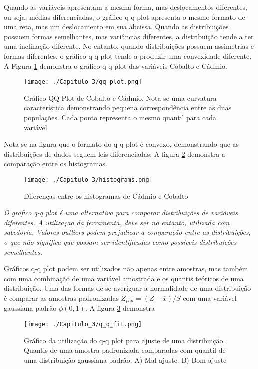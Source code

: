 Quando as variáveis apresentam a mesma forma, mas deslocamentos diferentes, ou seja, médias diferenciadas, o gráfico q-q plot apresenta o mesmo formato de uma reta, mas um deslocamento em sua abcissa. Quando as distribuições possuem formas semelhantes, mas variâncias diferentes, a distribuição tende a ter uma inclinação diferente. No entanto, quando distribuições possuem assimetrias e formas diferentes, o gráfico q-q plot tende a produzir uma convexidade diferente. A Figura \ref{QQplot} demonstra o gráfico q-q plot das variáveis Cobalto e Cádmio.

\FloatBarrier
\begin{figure}[!htb]
	\centering
	\texttt{[image: ./Capitulo\_3/qq-plot.png]}	
	\caption{Gráfico QQ-Plot de Cobalto e Cádmio. Nota-se uma curvatura característica demonstrando pequena correspondência entre as duas populações. Cada ponto representa o mesmo quantil para cada variável }
	\label{QQplot}
\end{figure}
\FloatBarrier

Nota-se na figura que o formato do q-q plot é convexo, demonstrando que as distribuições de dados seguem leis diferenciadas. A figura \ref{histograms} demonstra a comparação entre os histogramas. 

\FloatBarrier
\begin{figure}[!htb]
	\centering
	\texttt{[image: ./Capitulo\_3/histograms.png]}	
	\caption{Diferenças entre os histogramas de Cádmio e Cobalto}
	\label{histograms}
\end{figure}
\FloatBarrier

\begin{proposition}
	\textit{O gráfico q-q plot é uma alternativa para comparar distribuições de variáveis diferentes. A utilização da ferramenta, deve ser no entanto, utilizada com sabedoria. Valores outliers podem prejudicar a comparação entre as distribuições, o que não significa que possam ser identificadas como possíveis distribuições semelhantes.}
\end{proposition}

Gráficos q-q plot podem ser utilizados não apenas entre amostras, mas também com uma combinação de uma variável amostrada e os quantis teóricos de uma distribuição. Uma das formas de se averiguar a normalidade de uma distribuição é comparar as amostras padronizadas $Z_{pad} = (Z - \bar{x})/S$ com uma variável gaussiana padrão $\phi(0,1)$. A figura \ref{QQplot_adjust} demonstra 

\FloatBarrier
\begin{figure}[!htb]
	\centering
	\texttt{[image: ./Capitulo\_3/q\_q\_fit.png]}	
	\caption{Gráfico da utilização do q-q plot para ajuste de uma distribuição. Quantis de uma amostra padronizada comparadas com quantil de uma distribuição gaussiana padrão. A) Mal ajuste. B) Bom ajuste }
	\label{QQplot_adjust}
\end{figure}
\FloatBarrier

